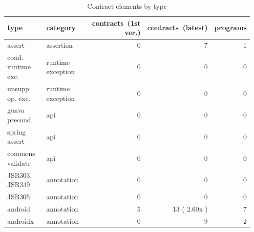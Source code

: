 \begin{table}[]
\centering
\caption{Contract elements by type}
\label{tab:contractsbytype}
\begin{tabular}{|p{5cm}|p{3cm}|r|r|r|} \hline
   type & category & \parbox{1.2cm}{contracts\ (1st ver.)}  & \parbox{1.2cm}{contracts\ (latest)} & pro\-grams \\ \hline
	assert &  assertion &  0 &  7 &  1 \\ 
	cond. runtime exc. &  runtime exception &  0 &  0 &  0 \\ 
	unsupp. op. exc. &  runtime exception &  0 &  0 &  0 \\ 
	guava precond. &  api &  0 &  0 &  0 \\ 
	spring assert &  api &  0 &  0 &  0 \\ 
	commons validate &  api &  0 &  0 &  0 \\ 
	JSR303, JSR349 &  annotation &  0 &  0 &  0 \\ 
	JSR305 &  annotation &  0 &  0 &  0 \\ 
	android &  annotation &  5 &  13 ( 2.60x ) &  7 \\ 
	androidx &  annotation &  0 &  9 &  2 \\ 
\hline
\end{tabular}
\end{table}
